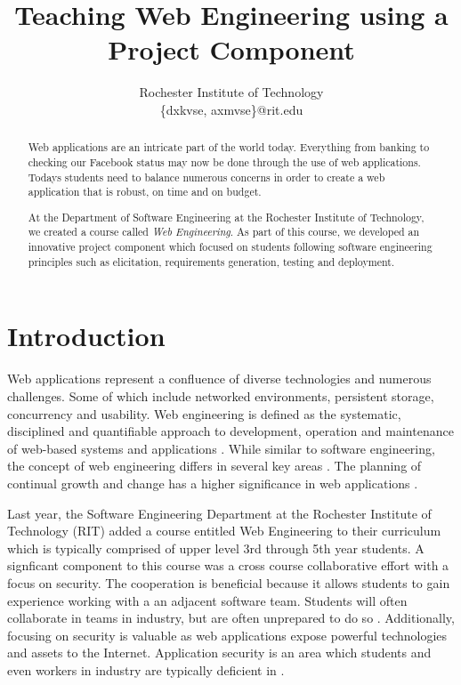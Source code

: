 \documentclass[conference]{IEEEtran}
\begin{document}
\title{Teaching Web Engineering using a Project Component}

\author{
Rochester Institute of Technology\\
\{dxkvse, axmvse\}@rit.edu

}


\maketitle


\begin{abstract}

Web applications are an intricate part of the world today. Everything from banking to checking our Facebook status may now be done through the use of web applications. Todays students need to balance numerous concerns in order to create a web application that is robust, on time and on budget.

At the Department of Software Engineering at the Rochester Institute of Technology, we created a course called \emph{Web Engineering}. As part of this course, we developed an innovative project component which focused on students following software
engineering principles such as elicitation, requirements generation, testing and deployment.

\end{abstract}


\section{Introduction}


Web applications represent a confluence of diverse technologies and numerous challenges. Some of which
include networked environments, persistent storage, concurrency and usability. Web engineering is defined as the systematic, disciplined and quantifiable approach to development, operation and maintenance of web-based systems and applications \cite{Schummer:2005:TDS:1149293.1149369} \cite{Mendes:2003:ACF:858403.858417} \cite{Reif05weesa-}. While similar to software engineering, the concept of web engineering differs in several key areas \cite{Ginige:2002:WEM:568760.568885}. The planning of continual growth and change has a higher significance in web applications \cite{Deshpande:2002:WE:2011098.2011101}. 

Last year, the Software Engineering Department at the Rochester Institute of Technology (RIT) added a course
entitled Web Engineering to their curriculum which is typically comprised of upper level 3rd through 5th year students. A signficant component to this course was a cross course collaborative effort with a focus on security. The cooperation is beneficial because it allows students to gain experience working with a an adjacent software team. Students will often collaborate in teams in industry, but are often unprepared to do so \cite{Kilamo:2012:TCS:2337223.2337376}. Additionally, focusing on security is valuable as web applications expose powerful technologies and assets to the Internet. Application security is an area which students and even workers in industry are typically deficient in \cite{Walden:2008:IWA:1414558.1414607} \cite{Glisson:2006:WES:1145581.1145633}.
\end{document}
